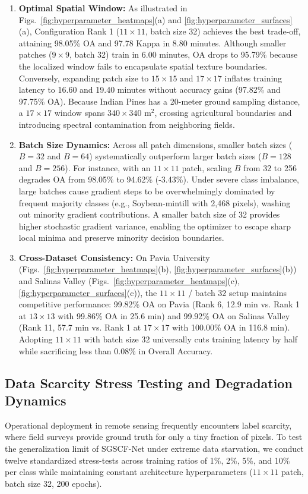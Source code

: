 \documentclass[manuscript,screen,review]{acmart}
\begin{document}
\begin{enumerate}
    \item \textbf{Optimal Spatial Window:} As illustrated in Figs.~\ref{fig:hyperparameter_heatmaps}(a) and \ref{fig:hyperparameter_surfaces}(a), Configuration Rank 1 ($11 \times 11$, batch size 32) achieves the best trade-off, attaining 98.05\% OA and 97.78 Kappa in 8.80 minutes. Although smaller patches ($9 \times 9$, batch 32) train in 6.00 minutes, OA drops to 95.79\% because the localized window fails to encapsulate spatial texture boundaries. Conversely, expanding patch size to $15 \times 15$ and $17 \times 17$ inflates training latency to 16.60 and 19.40 minutes without accuracy gains (97.82\% and 97.75\% OA). Because Indian Pines has a 20-meter ground sampling distance, a $17 \times 17$ window spans $340 \times 340 \text{ m}^2$, crossing agricultural boundaries and introducing spectral contamination from neighboring fields.
    \item \textbf{Batch Size Dynamics:} Across all patch dimensions, smaller batch sizes ($B=32$ and $B=64$) systematically outperform larger batch sizes ($B=128$ and $B=256$). For instance, with an $11 \times 11$ patch, scaling $B$ from 32 to 256 degrades OA from 98.05\% to 94.62\% (-3.43\%). Under severe class imbalance, large batches cause gradient steps to be overwhelmingly dominated by frequent majority classes (e.g., Soybean-mintill with 2,468 pixels), washing out minority gradient contributions. A smaller batch size of 32 provides higher stochastic gradient variance, enabling the optimizer to escape sharp local minima and preserve minority decision boundaries.
    \item \textbf{Cross-Dataset Consistency:} On Pavia University (Figs.~\ref{fig:hyperparameter_heatmaps}(b), \ref{fig:hyperparameter_surfaces}(b)) and Salinas Valley (Figs.~\ref{fig:hyperparameter_heatmaps}(c), \ref{fig:hyperparameter_surfaces}(c)), the $11 \times 11$ / batch 32 setup maintains competitive performance: 99.82\% OA on Pavia (Rank 6, 12.9 min vs. Rank 1 at $13 \times 13$ with 99.86\% OA in 25.6 min) and 99.92\% OA on Salinas Valley (Rank 11, 57.7 min vs. Rank 1 at $17 \times 17$ with 100.00\% OA in 116.8 min). Adopting $11 \times 11$ with batch size 32 universally cuts training latency by half while sacrificing less than 0.08\% in Overall Accuracy.
\end{enumerate}

\subsection{Data Scarcity Stress Testing and Degradation Dynamics}
\label{subsec:scarcity_analysis}
Operational deployment in remote sensing frequently encounters label scarcity, where field surveys provide ground truth for only a tiny fraction of pixels. To test the generalization limit of SGSCF-Net under extreme data starvation, we conduct twelve standardized stress-tests across training ratios of 1\%, 2\%, 5\%, and 10\% per class while maintaining constant architecture hyperparameters ($11 \times 11$ patch, batch size 32, 200 epochs).
\end{document}

